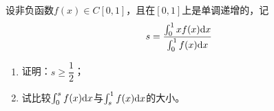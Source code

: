 \begin{proposition}

    设非负函数$f(x) \in C[0, 1]$，且在$[0, 1]$上是单调递增的，记
    \[s = \dfrac{\int_{0}^{1}{xf(x)}\mathrm{d} x}{\int_{0}^{1}{f(x)}\mathrm{d} x}\]

    \begin{enumerate}

        \item 证明：$s \geq \dfrac{1}{2}$；
        
        \item 试比较$\int_{0}^{s}{f(x)}\mathrm{d} x$与$\int_{s}^{1}{f(x)}\mathrm{d} x$的大小。
        
    \end{enumerate}

\end{proposition}

